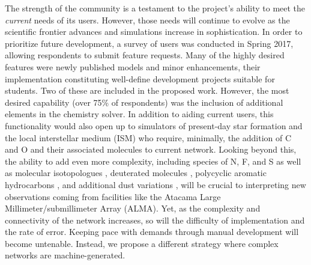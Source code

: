 The strength of the \grackle{} community is a testament to the
project's ability to meet the \textit{current} needs of its users.  However,
those needs will continue to evolve as the scientific frontier
advances and simulations increase in sophistication.  In order to
prioritize future development, a survey of \grackle{} users was
conducted in Spring 2017, allowing respondents to submit feature
requests.  Many of the highly desired features were newly published
models and minor enhancements, their implementation constituting
well-define development projects suitable for students.  Two of these
are included in the proposed work.  However, the most desired
capability (over 75\% of respondents) was the inclusion of additional
elements in the chemistry solver.  In addition to aiding current
users, this functionality would also open \grackle{} up to simulators
of present-day star formation and the local interstellar medium (ISM)
who require, minimally, the addition of C and O and their
associated molecules to  current network.  Looking beyond
this, the ability to add even more complexity, including species of
N, F, and S as well as molecular isotopologues
\citep{2008ApJ...679..481P}, deuterated molecules
\citep{2005ApJ...619..379C}, polycyclic aromatic hydrocarbons
\citep[PAHs,][]{2016JPhCS.728f2005G}, and
additional dust variations \citep{2013RvMP...85.1021T}, will be crucial
to interpreting new observations coming from facilities like the
Atacama Large Millimeter/submillimeter Array (ALMA).
Yet, as the complexity and connectivity of the network increases, so
will the difficulty of implementation and the rate of error.  Keeping
pace with demands through manual development will become
untenable.  Instead, we propose a different strategy where complex
networks are machine-generated.

